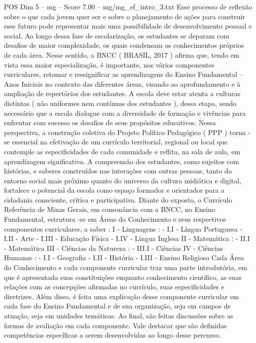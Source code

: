 \begin{textsample}{POS Dim 5 – mg – Score 7.00 – mg/mg\_ef\_intro\_3.txt}
Esse processo de reflexão sobre o que cada jovem quer ser e sobre o planejamento de ações para construir esse futuro pode representar mais uma possibilidade de desenvolvimento pessoal e social.
Ao longo dessa fase de escolarização, os estudantes se deparam com desafios de maior complexidade, os quais condensam os conhecimentos próprios de cada área.
Nesse sentido, a BNCC ( BRASIL, 2017 ) afirma que, tendo em vista essa maior especialização, é importante, nos vários componentes curriculares, retomar e ressignificar as aprendizagens do Ensino Fundamental – Anos Iniciais no contexto das diferentes áreas, visando ao aprofundamento e à ampliação de repertórios dos estudantes.
A escola deve estar atenta a culturas distintas ( não uniformes nem contínuas dos estudantes ), dessa etapa, sendo necessário que a escola dialogue com a diversidade de formação e vivências para enfrentar com sucesso os desafios de seus propósitos educativos.
Nessa perspectiva, a construção coletiva do Projeto Político Pedagógico ( PPP ) torna -se essencial na efetivação de um currículo territorial, regional ou local que contemple as especificidades de cada comunidade e reflita, na sala de aula, em aprendizagem significativa.
A compreensão dos estudantes, como sujeitos com histórias, e saberes construídos nas interações com outras pessoas, tanto do entorno social mais próximo quanto do universo da cultura midiática e digital, fortalece o potencial da escola como espaço formador e orientador para a cidadania consciente, crítica e participativa.
Diante do exposto, o Currículo Referência de Minas Gerais, em consonância com a BNCC, no Ensino Fundamental, estrutura -se em Áreas do Conhecimento e seus respectivos componentes curriculares, a saber : I - Linguagens : - I.I - Língua Portuguesa - I.II - Arte - I.III - Educação Física - I.IV - Língua Inglesa II - Matemática : - II.I - Matemática III - Ciências da Natureza : - III.I - Ciências IV - Ciências Humanas : - I.I - Geografia - I.II - História - I.III - Ensino Religioso Cada Área do Conhecimento e cada componente curricular traz uma parte introdutória, em que é apresentada suas constituições enquanto conhecimento científico, as suas relações com as concepções afirmadas no currículo, suas especificidades e diretrizes.
Além disso, é feita uma explicação desse componente curricular em cada fase do Ensino Fundamental e de sua organização, seja em campos de atuação, seja em unidades temáticas.
Ao final, são feitas discussões sobre as formas de avaliação em cada componente.
Vale destacar que são definidas competências específicas a serem desenvolvidas ao longo desse percurso.

\end{textsample}
